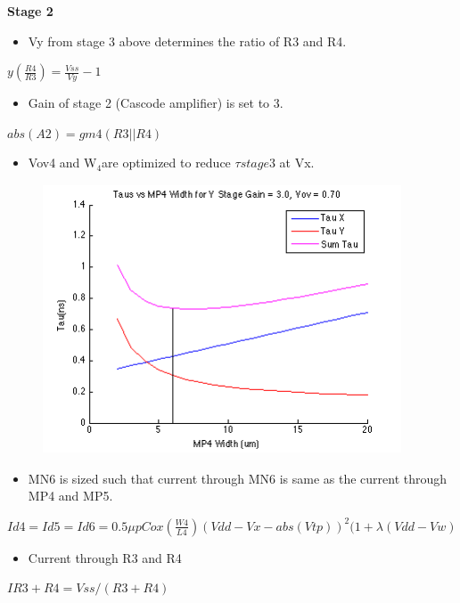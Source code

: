 \documentclass[12pt,a4paper]{article}
\begin{document}
\textbf{Stage 2}

\begin{itemize}
\item Vy from stage 3 above determines the ratio of R3 and R4.
\end{itemize}
$y (\frac{R4}{R3})=\frac{Vss}{Vy}-1 $\\


\begin{itemize}
\item Gain of stage 2 (Cascode amplifier) is set to 3.
\end{itemize}
$abs(A2)=gm4(R3 || R4) $\\


\begin{itemize}
\item Vov4 and W$_{4 }$are optimized to reduce $\tau stage3$ at Vx. 

\end{itemize}


\begin{figure}[h]
\centering
\includegraphics[width=10.63cm,height=7.99cm]{tau_x_y_vs_mp4.png}
\end{figure}


\begin{itemize}
\item MN6 is sized such that current through MN6 is same as the current 
through MP4 and MP5. 
\end{itemize}
$Id4=Id5=Id6=0.5\mu pCox(\frac{W4}{L4})(Vdd-Vx-abs(Vtp))^{2} (1+\lambda 
(Vdd-Vw)$\\


\begin{itemize}
\item Current through R3 and R4
\end{itemize}
$IR3+R4=Vss/(R3+R4)$\\
\end{document}
